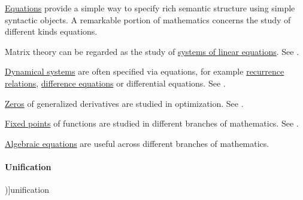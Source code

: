 \begin{example}\label{ex:def:equation}
  \hyperref[def:equation]{Equations} provide a simple way to specify rich semantic structure using simple syntactic objects. A remarkable portion of mathematics concerns the study of different kinds equations.

  \begin{thmenum}
     Matrix theory can be regarded as the study of \hyperref[def:system_of_linear_equations]{systems of linear equations}. See .

     \hyperref[def:abstract_dynamical_system]{Dynamical systems} are often specified via equations, for example \hyperref[def:recurrence_relation]{recurrence relations}, \hyperref[def:difference_equation]{difference equations} or differential equations. See .

     \hyperref[def:zero_of_function]{Zeros} of generalized derivatives are studied in optimization. See .

     \hyperref[def:function_fixed_point]{Fixed points} of functions are studied in different branches of mathematics. See .

     \hyperref[def:algebraic_equation]{Algebraic equations} are useful across different branches of mathematics.
  \end{thmenum}
\end{example}

\paragraph{Unification}

\begin{concept}\label{con:unification}
  \term[en=unification, ru=унификация (\cite[152]{Герасимов2011Вычислимость})]{unification}
  \todo{}
\end{concept}
